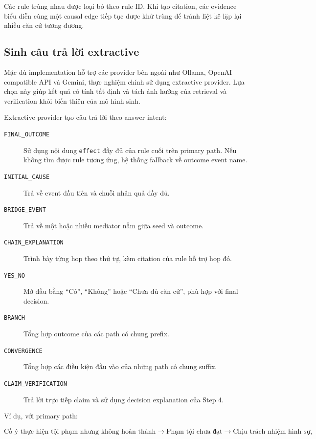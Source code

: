 Các rule trùng nhau được loại bỏ theo rule ID. Khi tạo citation, các evidence
biểu diễn cùng một causal edge tiếp tục được khử trùng để tránh liệt kê lặp
lại nhiều căn cứ tương đương.

\subsection{Sinh câu trả lời extractive}

Mặc dù implementation hỗ trợ các provider bên ngoài như Ollama, OpenAI
compatible API và Gemini, thực nghiệm chính sử dụng extractive provider.
Lựa chọn này giúp kết quả có tính tất định và tách ảnh hưởng của retrieval
và verification khỏi biến thiên của mô hình sinh.

Extractive provider tạo câu trả lời theo answer intent:

\begin{description}
    \item[\texttt{FINAL\_OUTCOME}] Sử dụng nội dung \texttt{effect} đầy đủ
    của rule cuối trên primary path. Nếu không tìm được rule tương ứng, hệ
    thống fallback về outcome event name.

    \item[\texttt{INITIAL\_CAUSE}] Trả về event đầu tiên và chuỗi nhân quả
    đầy đủ.

    \item[\texttt{BRIDGE\_EVENT}] Trả về một hoặc nhiều mediator nằm giữa
    seed và outcome.

    \item[\texttt{CHAIN\_EXPLANATION}] Trình bày từng hop theo thứ tự, kèm
    citation của rule hỗ trợ hop đó.

    \item[\texttt{YES\_NO}] Mở đầu bằng ``Có'', ``Không'' hoặc ``Chưa đủ căn
    cứ'', phù hợp với final decision.

    \item[\texttt{BRANCH}] Tổng hợp outcome của các path có chung prefix.

    \item[\texttt{CONVERGENCE}] Tổng hợp các điều kiện đầu vào của những path
    có chung suffix.

    \item[\texttt{CLAIM\_VERIFICATION}] Trả lời trực tiếp claim và sử dụng
    decision explanation của Step 4.
\end{description}

Ví dụ, với primary path:

\[
\text{Cố ý thực hiện tội phạm nhưng không hoàn thành}
\rightarrow
\text{Phạm tội chưa đạt}
\rightarrow
\text{Chịu trách nhiệm hình sự},
\]

